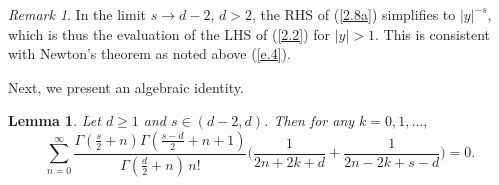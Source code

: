 \documentclass[10pt]{amsart}
\theoremstyle{plain}
\newtheorem{lem}[thm]{Lemma}
\theoremstyle{remark}
\newtheorem{rem}{Remark}
\numberwithin{equation}{section}
\begin{document}
\begin{rem}
In the limit $s \to d - 2$, $d > 2$, the RHS of (\ref{2.8a}) simplifies to $|y|^{-s}$, which is thus the evaluation of the LHS of (\ref{2.2}) for $|y| > 1$. This is consistent with Newton's theorem as noted above (\ref{e.4}).
\end{rem}







Next, we present an algebraic identity. 

\begin{lem} \label{Lem_algebraic equal}
Let $d \ge 1$ and $s \in (d-2,d)$. Then for any $k=0,1,\dots,$   
\begin{equation}
 \sum_{n=0}^\infty \frac{ \Gamma(\frac{s}{2}+n) \Gamma( \frac{s-d}{2}+n+1 )  }{ \Gamma(\frac{d}{2}+n) \, n! } \Big( \frac{1}{2n+2k+d}+\frac{1}{ 2n-2k+s-d } \Big) =0. 
\end{equation}
\end{lem}
\end{document}
